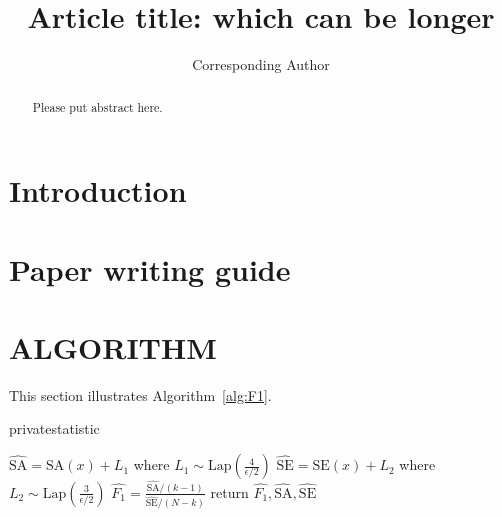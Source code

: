 \documentclass[USenglish,oneside,twocolumn]{article}
\begin{document}
 \author*[1]{Corresponding Author}
  \title{\huge Article title: which can be longer}



  \begin{abstract}
{Please put abstract here.}
\end{abstract}


 

\maketitle
\section{Introduction}

\section{Paper writing guide}

\section{ALGORITHM}
This section illustrates Algorithm~\ref{alg:F1}.
\begin{algorithm}[h]
    \caption{privatestatistic \label{alg:F1}}
    \begin{algorithmic}
        \STATE $\widehat{\text{SA}} = \text{SA}(x) + L_1$ where $L_1\sim\text{Lap}\left(\frac{4}{\epsilon/2}\right)$ 
        \STATE $\widehat{\text{SE}} = \text{SE}(x) + L_2$ where $L_2\sim\text{Lap}\left(\frac{3}{\epsilon/2}\right)$
        \STATE  $\widehat{F_1} = \frac{\widehat{\text{SA}}/(k-1)}{\widehat{\text{SE}}/(N-k)}$
        \STATE return $\widehat{F_1}, \widehat{\text{SA}}, \widehat{\text{SE}}$
    \end{algorithmic}
\end{algorithm}
\end{document}
